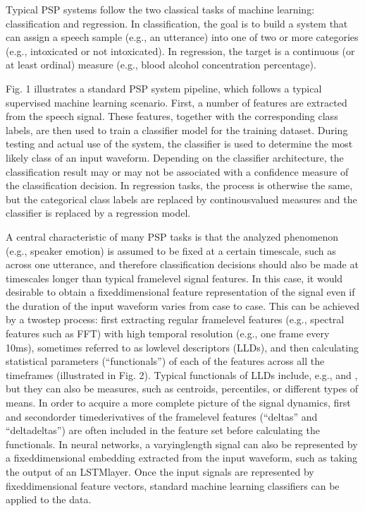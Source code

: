 \documentclass[letterpaper,10pt,english]{jupyterBook}
\begin{document}
\sphinxAtStartPar
Typical PSP systems follow the two classical tasks of machine learning:
classification and regression. In classification, the goal is to build a
system that can assign a speech sample (e.g., an utterance) into one of
two or more categories (e.g., intoxicated or not intoxicated). In
regression, the target is a continuous (or at least ordinal) measure
(e.g., blood alcohol concentration percentage).

\sphinxAtStartPar
Fig. 1 illustrates a standard PSP system pipeline, which follows a
typical supervised machine learning scenario. First, a number of
features are extracted from the speech signal. These features, together
with the corresponding class labels, are then used to train a classifier
model for the training dataset. During testing and actual use of the
system, the classifier is used to determine the most likely class of an
input waveform. Depending on the classifier architecture, the
classification result may or may not be associated with a confidence
measure of the classification decision. In regression tasks, the process
is otherwise the same, but the categorical class labels are replaced by
continous\sphinxhyphen{}valued measures and the classifier is replaced by a regression
model.

\sphinxAtStartPar
A central characteristic of many PSP tasks is that the analyzed
phenomenon (e.g., speaker emotion) is assumed to be fixed at a certain
time\sphinxhyphen{}scale, such as across one utterance, and therefore classification
decisions should also be made at time\sphinxhyphen{}scales longer than typical
frame\sphinxhyphen{}level signal features. In this case, it would desirable to obtain
a fixed\sphinxhyphen{}dimensional feature representation of the signal even if the
duration of the input waveform varies from case to case. This can be
achieved by a two\sphinxhyphen{}step process:  first extracting regular
frame\sphinxhyphen{}level features (e.g., spectral features such as FFT) with high
temporal resolution (e.g., one frame every 10\sphinxhyphen{}ms), sometimes referred to
as low\sphinxhyphen{}level descriptors (LLDs), and then  calculating statistical
parameters (“functionals”) of each of the features across all the
time\sphinxhyphen{}frames (illustrated in Fig. 2). Typical functionals of LLDs
include, e.g.,  and , but
they can also be measures, such as centroids, percentiles, or different
types of means. In order to acquire a more complete picture of the
signal dynamics, first\sphinxhyphen{} and second\sphinxhyphen{}order time\sphinxhyphen{}derivatives of the
frame\sphinxhyphen{}level features (“deltas” and “delta\sphinxhyphen{}deltas”) are often included in
the feature set before calculating the functionals. In neural networks,
a varying\sphinxhyphen{}length signal can also be represented by a fixed\sphinxhyphen{}dimensional
embedding extracted from the input waveform, such as taking the output
of an LSTM\sphinxhyphen{}layer. Once the input signals are represented by
fixed\sphinxhyphen{}dimensional feature vectors, standard machine learning classifiers
can be applied to the data.
\end{document}
